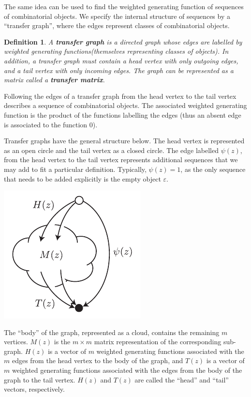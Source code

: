 \documentclass{article}
\newtheorem{definition}{Definition}
\newenvironment{inset}
{\vspace{0.5\baselineskip}\begin{center}}
{\end{center}\vspace{0.5\baselineskip}}
\begin{document}
The same idea can be used to find the weighted generating function of
sequences of combinatorial objects. We specify the internal structure of
sequences by a ``transfer graph'', where the edges represent classes of
combinatorial objects.

\begin{definition}
\label{def:transfermat}
A \textbf{transfer graph} is a directed graph whose edges are labelled by
weighted generating functions(themselves representing classes of objects).
In addition, a transfer graph must contain a head vertex with only
outgoing edges, and a tail vertex with only incoming edges. The graph can
be represented as a matrix called a \textbf{transfer matrix}.
\end{definition}

Following the edges of a transfer graph from the head vertex to the tail
vertex describes a sequence of combinatorial objects. The associated
weighted generating function is the product of the functions labelling the
edges (thus an absent edge is associated to the function $0$).

Transfer graphs have the general structure below. The head vertex is
represented as an open circle and the tail vertex as a closed circle. The
edge labelled $\psi(z)$, from the head vertex to the tail vertex
represents additional sequences that we may add to fit a particular
definition. Typically, $\psi(z) = 1$, as the only sequence that needs to
be added explicitly is the empty object
$\varepsilon$.

\begin{inset}
\includegraphics[scale=1.0]{cloud.pdf}
\end{inset}

The ``body'' of the graph, represented as a cloud, contains the remaining
$m$ vertices. $M(z)$ is the $m \times m$ matrix representation of the
corresponding sub-graph. $H(z)$ is a vector of $m$ weighted generating
functions associated with the $m$ edges from the head vertex to the body
of the graph, and $T(z)$ is a vector of $m$ weighted generating functions
associated with the edges from the body of the graph to the tail vertex.
$H(z)$ and $T(z)$ are called the ``head'' and ``tail'' vectors,
respectively.
\end{document}
